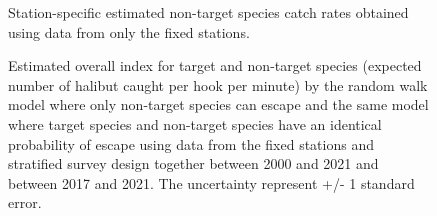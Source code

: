 \documentclass[12pt]{article}\usepackage[]{graphicx}\usepackage[]{color}
\begin{document}
\begin{appendices}
\begin{figure}[htb]
{}

\caption{Station-specific estimated non-target species catch rates obtained using data from only the fixed stations.}\label{fig:non-target-spat-fixed}
\end{figure}
\begin{figure}[htb]

{\centering {}  

}

\caption{Estimated overall index for target and non-target species (expected number of halibut caught per hook per minute) by the random walk model where only non-target species can escape and the same model where target species and non-target species have an identical probability of escape using data from the fixed stations and stratified survey design together between 2000 and 2021 and between 2017 and 2021. The uncertainty represent +/- 1 standard error.}\label{fig:new-target-indices}
\end{figure}
\begin{figure}[htb]


\end{figure}
\end{appendices}
\end{document}
